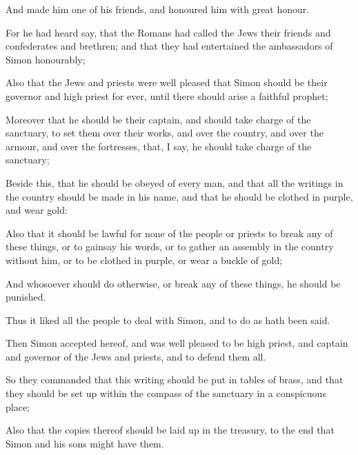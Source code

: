 {\par }{\PP {}And made him one of his friends, and honoured him with great honour.
\par }{\PP {}For he had heard say, that the Romans had called the Jews their friends and confederates and brethren; and that they had entertained the ambassadors of Simon honourably;
\par }{\PP {}Also that the Jews and priests were well pleased that Simon should be their governor and high priest for ever, until there should arise a faithful prophet;
\par }{\PP {}Moreover that he should be their captain, and should take charge of the sanctuary, to set them over their works, and over the country, and over the armour, and over the fortresses, that, I say, he should take charge of the sanctuary;
\par }{\PP {}Beside this, that he should be obeyed of every man, and that all the writings in the country should be made in his name, and that he should be clothed in purple, and wear gold:
\par }{\PP {}Also that it should be lawful for none of the people or priests to break any of these things, or to gainsay his words, or to gather an assembly in the country without him, or to be clothed in purple, or wear a buckle of gold;
\par }{\PP {}And whosoever should do otherwise, or break any of these things, he should be punished.
\par }{\PP {}Thus it liked all the people to deal with Simon, and to do as hath been said.
\par }{\PP {}Then Simon accepted hereof, and was well pleased to be high priest, and captain and governor of the Jews and priests, and to defend them all.
\par }{\PP {}So they commanded that this writing should be put in tables of brass, and that they should be set up within the compass of the sanctuary in a conspicuous place;
\par }{\PP {}Also that the copies thereof should be laid up in the treasury, to the end that Simon and his sons might have them.

}
